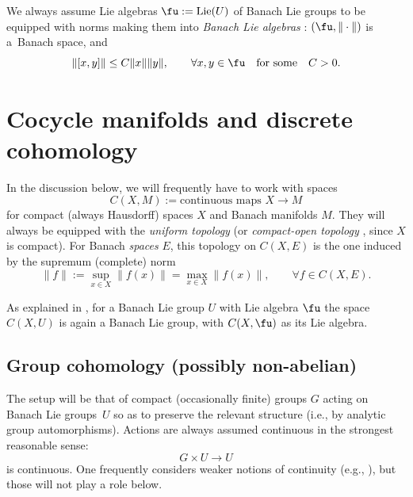We always assume Lie algebras $\fu:=\operatorname{Lie}(U)$ of Banach Lie groups to be equipped with norms making them into {\it Banach Lie algebras} \cite[discussion following Definition IV.1]{neeb-inf}: $(\fu,\|\cdot\|)$ is a~Banach space, and
\begin{equation*}
 \|[x,y]\|\le C\|x\| \|y\|,\qquad \forall x,y\in \fu \quad\text{for some}\quad C>0.
\end{equation*}

\section{Cocycle manifolds and discrete cohomology}\label{subse:cocyman}

In the discussion below, we will frequently have to work with spaces
\begin{equation*}
 C(X,M)
 :=
 \text{continuous maps }X\to M
\end{equation*}
for compact (always Hausdorff) spaces $X$ and Banach manifolds $M$. They will always be equipped with the {\it uniform topology} (or {\it compact-open topology} \cite[Definition preceding Theorem 46.8]{munk}, since $X$ is compact). For Banach {\it spaces} $E$, this topology on $C(X,E)$ is the one induced by the supremum (complete) norm
\begin{equation*}
 \|f\|:=\sup_{x\in X}\|f(x)\| = \max_{x\in X}\|f(x)\|,\qquad \forall f\in C(X,E).
\end{equation*}

As explained in \cite[Section~3.2]{ps-loop}, for a Banach Lie group $U$ with Lie algebra $\fu$ the space $C(X,U)$ is again a Banach Lie group, with $C(X,\fu)$ as its Lie algebra.

\subsection{Group cohomology (possibly non-abelian)}\label{subse:coh}

The setup will be that of compact (occasionally finite) groups $G$ acting on Banach Lie groups~$U$ so as to preserve the relevant structure (i.e., by analytic group automorphisms). Actions are always assumed continuous in the strongest reasonable sense:
\begin{equation*}
 G\times U\to U
\end{equation*}
is continuous. One frequently considers weaker notions of continuity (e.g., \cite[Section~X.1]{tak2}), but those will not play a role below.

